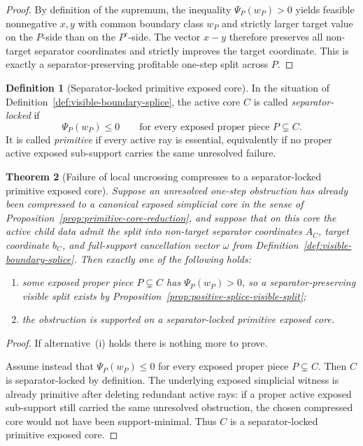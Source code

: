\documentclass[11pt]{article}
\newtheorem{theorem}{Theorem}[section]
\theoremstyle{definition}
\newtheorem{definition}[theorem]{Definition}
\newcommand{\1}{\mathbf{1}}
\begin{document}
\begin{proof}
By definition of the supremum, the inequality $\Psi_P(w_P)>0$ yields feasible nonnegative $x,y$ with common boundary class $w_P$ and strictly larger target value on the $P$-side than on the $P^c$-side. The vector $x-y$ therefore preserves all non-target separator coordinates and strictly improves the target coordinate. This is exactly a separator-preserving profitable one-step split across $P$.
\end{proof}

\begin{definition}[Separator-locked primitive exposed core]\label{def:separator-locked-core}
In the situation of Definition~\ref{def:visible-boundary-splice}, the active core $C$ is called \emph{separator-locked} if
\[
\Psi_P(w_P)\le 0
\qquad\text{for every exposed proper piece }P\subsetneq C.
\]
It is called \emph{primitive} if every active ray is essential, equivalently if no proper active exposed sub-support carries the same unresolved failure.
\end{definition}

\begin{theorem}[Failure of local uncrossing compresses to a separator-locked primitive exposed core]\label{thm:separator-locked-core-reduction}
Suppose an unresolved one-step obstruction has already been compressed to a canonical exposed simplicial core in the sense of Proposition~\ref{prop:primitive-core-reduction}, and suppose that on this core the active child data admit the split into non-target separator coordinates $A_C$, target coordinate $b_C$, and full-support cancellation vector $\omega$ from Definition~\ref{def:visible-boundary-splice}. Then exactly one of the following holds:
\begin{enumerate}[label=(\roman*),leftmargin=2.2em]
\item some exposed proper piece $P\subsetneq C$ has $\Psi_P(w_P)>0$, so a separator-preserving visible split exists by Proposition~\ref{prop:positive-splice-visible-split};
\item the obstruction is supported on a separator-locked primitive exposed core.
\end{enumerate}
\end{theorem}

\begin{proof}
If alternative~(i) holds there is nothing more to prove.

Assume instead that $\Psi_P(w_P)\le 0$ for every exposed proper piece $P\subsetneq C$. Then $C$ is separator-locked by definition. The underlying exposed simplicial witness is already primitive after deleting redundant active rays: if a proper active exposed sub-support still carried the same unresolved obstruction, the chosen compressed core would not have been support-minimal. Thus $C$ is a separator-locked primitive exposed core.
\end{proof}
\end{document}
